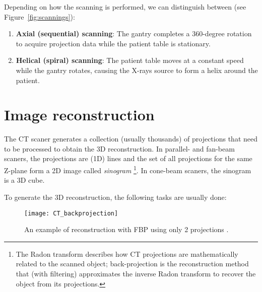 Depending on how the scanning is performed, we can distinguish between
(see Figure~\ref{fig:scannings}):

\begin{enumerate}
\item \textbf{Axial (sequential) scanning}:
  The gantry completes a 360-degree rotation to acquire projection
  data while the patient table is stationary. 

\item \textbf{Helical (spiral) scanning}: The patient table moves
  at a constant speed while the gantry rotates, causing the X-rays
  source to form a helix around the patient.
\end{enumerate}

\section{Image reconstruction}
The CT scaner generates a collection (usually thousands) of
projections that need to be processed to obtain the 3D
reconstruction. In parallel- and fan-beam scaners, the projections are
(1D) lines and the set of all projections for the same Z-plane form a
2D image called \emph{sinogram}
\cite{wikipedia2025radom_transform}\footnote{The Radon transform
  describes how CT projections are mathematically related to the
  scanned object; back-projection is the reconstruction method that
  (with filtering) approximates the inverse Radon transform to recover
  the object from its projections.}. In cone-beam scaners, the
sinogram is a 3D cube.

To generate the 3D reconstruction, the following tasks are usually done:

\begin{figure}
  \centering
  \texttt{[image: CT\_backprojection]}
  \caption{An example of reconstruction with FBP using only 2
    projections
    \cite{abdulla2025acquiring2}.\label{fig:CT_reconstruction}}
\end{figure}

